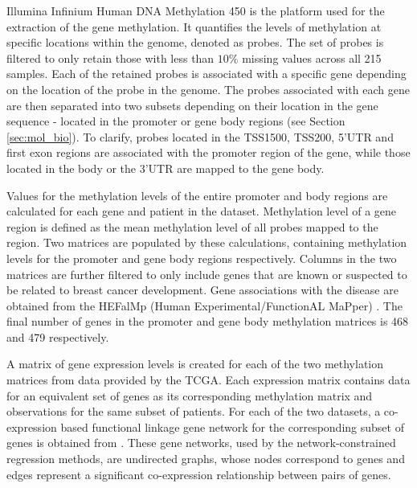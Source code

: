 Illumina Infinium Human DNA Methylation 450 is the platform used for the extraction of the gene methylation. It quantifies the levels of methylation at specific locations within the genome, denoted as probes. The set of probes is filtered to only retain those with less than $10\%$ missing values across all 215 samples. Each of the retained probes is associated with a specific gene depending on the location of the probe in the genome.
The probes associated with each gene are then separated into two subsets depending on their location in the gene sequence - located in the promoter or gene body regions (see Section \ref{sec:mol_bio}). To clarify, probes located in the TSS1500, TSS200, 5'UTR and first exon regions are associated with the promoter region of the gene, while those located in the body or the 3'UTR are mapped to the gene body.

Values for the methylation levels of the entire promoter and body regions are calculated for each gene and patient in the dataset. Methylation level of a gene region is defined as the mean methylation level of all probes mapped to the region. Two matrices are populated by these calculations, containing methylation levels for the promoter and gene body regions respectively.
Columns in the two matrices are further filtered to only include genes that are known or suspected to be related to breast cancer development. Gene associations with the disease are obtained from the HEFalMp (Human Experimental/FunctionAL MaPper) \cite{huttenhower2009exploring}. The final number of genes in the promoter and gene body methylation matrices is 468 and 479 respectively.

A matrix of gene expression levels is created for each of the two methylation matrices from data provided by the TCGA. Each expression matrix contains data for an equivalent set of genes as its corresponding methylation matrix and observations for the same subset of patients. 
For each of the two datasets, a co-expression based functional linkage gene network for the corresponding subset of genes is obtained from \cite{zhang2013network}. These gene networks, used by the network-constrained regression methods, are undirected graphs, whose nodes correspond to genes and edges represent a significant co-expression relationship between pairs of genes.



